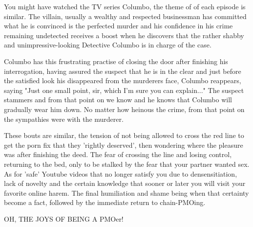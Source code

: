 You might have watched the TV series Columbo, the theme of of each episode is similar. The villain, usually a wealthy and respected businessman has committed what he is convinced is the perfected murder and his confidence in his crime remaining undetected receives a boost when he discovers that the rather shabby and unimpressive-looking Detective Columbo is in charge of the case.

Columbo has this frustrating practise of closing the door after finishing his interrogation, having assured the suspect that he is in the clear and just before the satisfied look his disappeared from the murderers face, Columbo reappears, saying "Just one small point, sir, which I'm sure you can explain..." The suspect stammers and from that point on we know and he knows that Columbo will gradually wear him down. No matter how heinous the crime, from that point on the sympathies were with the murderer.

These bouts are similar, the tension of not being allowed to cross the red line to get the porn fix that they 'rightly deserved', then wondering where the pleasure was after finishing the deed. The fear of crossing the line and losing control, returning to the bed, only to be stalked by the fear that your partner wanted sex. As for 'safe' Youtube videos that no longer satisfy you due to densensitiation, lack of novelty and the certain knowledge that sooner or later you will visit your favorite online harem. The final humiliation and shame being when that certainty become a fact, followed by the immediate return to chain-PMOing.

\huge{OH, THE JOYS OF BEING A PMOer!}
